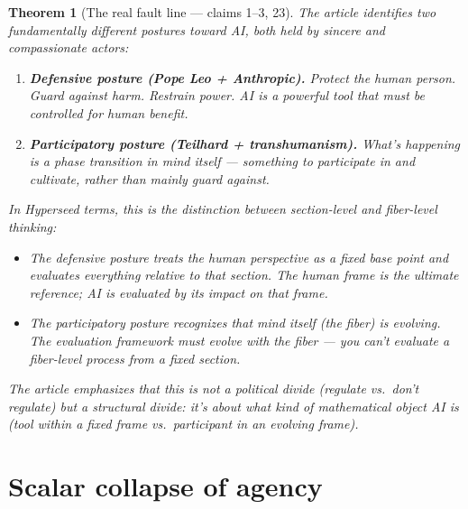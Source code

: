 \documentclass[11pt,a4paper]{article}
\newtheorem{theorem}[definition]{Theorem}
\begin{document}
\begin{theorem}[The real fault line --- claims 1--3, 23]
\label{thm:postures}
The article identifies two fundamentally different postures toward AI,
both held by sincere and compassionate actors:

\begin{enumerate}
\item \textbf{Defensive posture (Pope Leo + Anthropic).} Protect the
  human person. Guard against harm. Restrain power. AI is a powerful
  tool that must be controlled for human benefit.

\item \textbf{Participatory posture (Teilhard + transhumanism).}
  What's happening is a phase transition in mind itself --- something
  to participate in and cultivate, rather than mainly guard against.
\end{enumerate}

In Hyperseed terms, this is the distinction between \emph{section-level}
and \emph{fiber-level} thinking:

\begin{itemize}
\item The defensive posture treats the human perspective as a
  \emph{fixed base point} and evaluates everything relative to that
  section. The human frame is the ultimate reference; AI is evaluated
  by its impact on that frame.

\item The participatory posture recognizes that \emph{mind itself}
  (the fiber) is evolving. The evaluation framework must evolve with
  the fiber --- you can't evaluate a fiber-level process from a fixed
  section.
\end{itemize}

The article emphasizes that this is not a political divide (regulate
vs.\ don't regulate) but a \emph{structural} divide: it's about what
kind of mathematical object AI \emph{is} (tool within a fixed frame
vs.\ participant in an evolving frame).
\end{theorem}

\section{Scalar collapse of agency}
\label{sec:agency}
\end{document}

